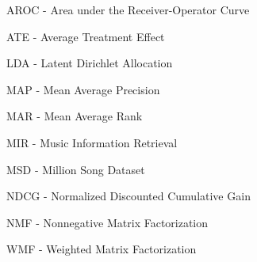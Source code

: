 AROC - Area under the Receiver-Operator Curve

ATE - Average Treatment Effect

LDA - Latent Dirichlet Allocation

MAP - Mean Average Precision

MAR - Mean Average Rank

MIR - Music Information Retrieval

MSD - Million Song Dataset

NDCG - Normalized Discounted Cumulative Gain

NMF - Nonnegative Matrix Factorization

WMF - Weighted Matrix Factorization